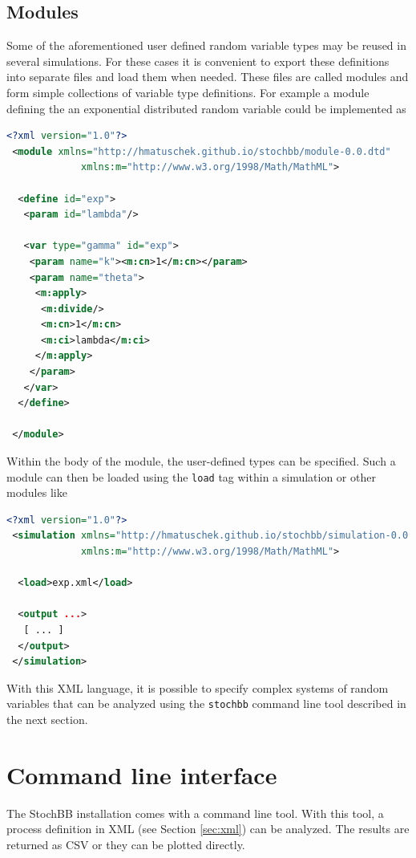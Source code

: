 \documentclass[a4paper, 10pt]{paper}
\newcommand{\code}[1]{\texttt{#1}}
\begin{document}
\subsection{Modules}
Some of the aforementioned user defined random variable types may be reused in several
simulations. For these cases it is convenient to export these definitions into separate files
and load them when needed. These files are called modules and form simple collections of
variable type definitions. For example a module defining the an exponential distributed 
random variable could be implemented as
\begin{lstlisting}[language=XML]
 <?xml version="1.0"?>
 <module xmlns="http://hmatuschek.github.io/stochbb/module-0.0.dtd"
             xmlns:m="http://www.w3.org/1998/Math/MathML">

  <define id="exp">
   <param id="lambda"/>

   <var type="gamma" id="exp">
    <param name="k"><m:cn>1</m:cn></param>
    <param name="theta">
     <m:apply>
      <m:divide/>
      <m:cn>1</m:cn>
      <m:ci>lambda</m:ci>
     </m:apply>
    </param>
   </var>
  </define>

 </module>
\end{lstlisting}

Within the body of the module, the user-defined types can be specified. Such a module can then
be loaded using the \code{load} tag within a simulation or other modules like
\begin{lstlisting}[language=XML]
 <?xml version="1.0"?>
 <simulation xmlns="http://hmatuschek.github.io/stochbb/simulation-0.0.dtd"
             xmlns:m="http://www.w3.org/1998/Math/MathML">

  <load>exp.xml</load>

  <output ...>
   [ ... ]
  </output>
 </simulation>
\end{lstlisting}

With this XML language, it is possible to specify complex systems of random variables that can be analyzed 
using the \code{stochbb} command line tool described in the next section.

\section{Command line interface} \label{sec:cli}
The StochBB installation comes with a command line tool. With this tool, a process definition
in XML (see Section \ref{sec:xml}) can be analyzed. The results are returned as CSV or they can be plotted
directly.
\end{document}
